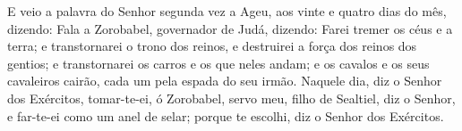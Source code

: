 E veio a palavra do Senhor segunda vez a Ageu, aos vinte e quatro
dias do mês, dizendo: Fala a Zorobabel, governador de Judá,
dizendo: Farei tremer os céus e a terra; e transtornarei o
trono dos reinos, e destruirei a força dos reinos dos gentios; e
transtornarei os carros e os que neles andam; e os cavalos e os seus
cavaleiros cairão, cada um pela espada do seu irmão. Naquele
dia, diz o Senhor dos Exércitos, tomar-te-ei, ó Zorobabel, servo
meu, filho de Sealtiel, diz o Senhor, e far-te-ei como um anel de
selar; porque te escolhi, diz o Senhor dos Exércitos.

